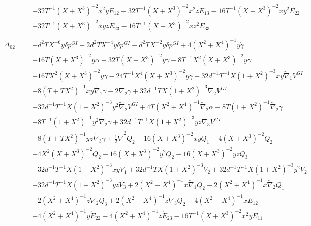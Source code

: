 \documentclass[10pt,letterpaper]{article}
\numberwithin{equation}{section}
\begin{document}
\begin{eqnarray}
&& - 32 T^{-1} (X + X^3)^{-2} x^2 y E_{12} - 32 T^{-1} (X + X^3)^{-2} x^2 z E_{13} - 16 T^{-1} (X + X^3)^{-2} x y^2 E_{22} \nonumber \\ 
&& - 32 T^{-1} (X + X^3)^{-2} x y z E_{23} - 16 T^{-1} (X + X^3)^{-2} x z^2 E_{33}
\\  \nonumber\\ 
\Delta_{02}&=& - d^2 T X^{-6} y \delta p^{GI}{} - 2 d^2 T X^{-4} y \delta p^{GI}{} -  d^2 T X^{-2} y \delta p^{GI}{} + 4 (X^2 + X^4)^{-1} y \dot{\gamma} \nonumber \\ 
&& + 16 T (X + X^3)^{-2} y \alpha + 32 T (X + X^3)^{-2} y \gamma - 8 T^{-1} X^2 (X + X^3)^{-2} y \gamma \nonumber \\ 
&& + 16 T X^2 (X + X^3)^{-2} y \gamma - 24 T^{-1} X^4 (X + X^3)^{-2} y \gamma + 32 d^{-1} T^{-1} X (1 + X^2)^{-3} x y \tilde{\nabla}_{1}V^{GI}{} \nonumber \\ 
&& - 8 (T + T X^2)^{-1} x y \tilde{\nabla}_{1}\gamma - 2 \tilde{\nabla}_{2}\dot{\gamma} + 32 d^{-1} T X (1 + X^2)^{-3} \tilde{\nabla}_{2}V^{GI}{} \nonumber \\ 
&& + 32 d^{-1} T^{-1} X (1 + X^2)^{-3} y^2 \tilde{\nabla}_{2}V^{GI}{} + 4 T (X^2 + X^4)^{-1} \tilde{\nabla}_{2}\alpha - 8 T (1 + X^2)^{-1} \tilde{\nabla}_{2}\gamma \nonumber \\ 
&& - 8 T^{-1} (1 + X^2)^{-1} y^2 \tilde{\nabla}_{2}\gamma + 32 d^{-1} T^{-1} X (1 + X^2)^{-3} y z \tilde{\nabla}_{3}V^{GI}{} \nonumber \\ 
&& - 8 (T + T X^2)^{-1} y z \tilde{\nabla}_{3}\gamma +\tfrac{1}{2} \tilde{\nabla}^{2}Q_{2} - 16 (X + X^3)^{-2} x y Q_{1} - 4 (X + X^3)^{-2} Q_{2} \nonumber \\ 
&& - 4 X^2 (X + X^3)^{-2} Q_{2} - 16 (X + X^3)^{-2} y^2 Q_{2} - 16 (X + X^3)^{-2} y z Q_{3} \nonumber \\ 
&& + 32 d^{-1} T^{-1} X (1 + X^2)^{-3} x y V_{1} + 32 d^{-1} T X (1 + X^2)^{-3} V_{2} + 32 d^{-1} T^{-1} X (1 + X^2)^{-3} y^2 V_{2} \nonumber \\ 
&& + 32 d^{-1} T^{-1} X (1 + X^2)^{-3} y z V_{3} + 2 (X^2 + X^4)^{-1} x \tilde{\nabla}_{1}Q_{2} - 2 (X^2 + X^4)^{-1} x \tilde{\nabla}_{2}Q_{1} \nonumber \\ 
&& - 2 (X^2 + X^4)^{-1} z \tilde{\nabla}_{2}Q_{3} + 2 (X^2 + X^4)^{-1} z \tilde{\nabla}_{3}Q_{2}-4 (X^2 + X^4)^{-1} x \dot{E}_{12} \nonumber \\ 
&& - 4 (X^2 + X^4)^{-1} y \dot{E}_{22} - 4 (X^2 + X^4)^{-1} z \dot{E}_{23} - 16 T^{-1} (X + X^3)^{-2} x^2 y E_{11} \nonumber \\ 

\end{eqnarray}
\end{document}
